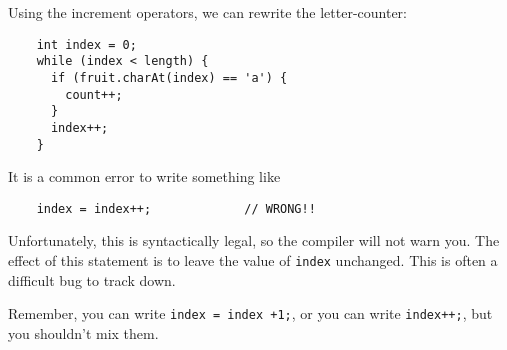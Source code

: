 \documentclass{book}
\makeatletter
\renewcommand{\section}{\@startsection 
    {section} {1} {0mm}%
    {-3.5ex \@plus -1ex \@minus -.2ex}%
    {0.7ex \@plus.2ex}%
    {\normalfont\Large\bfseries}}
\makeatother
\begin{document}
Using the increment operators, we can rewrite the letter-counter:

\begin{verbatim}
    int index = 0;
    while (index < length) {
      if (fruit.charAt(index) == 'a') {
        count++;
      }
      index++;
    }
\end{verbatim}
%
It is a common error to write something like

\begin{verbatim}
    index = index++;             // WRONG!!
\end{verbatim}
%
Unfortunately, this is syntactically legal, so the compiler
will not warn you.  The effect of this statement is to leave
the value of {\tt index} unchanged.  This is often a difficult
bug to track down.

Remember, you can write {\tt index = index +1;}, or you
can write {\tt index++;}, but you shouldn't mix them.





\end{document}
